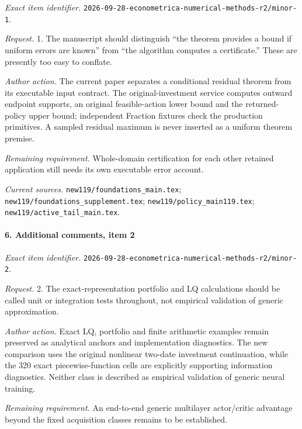 \emph{Exact item identifier.} \nolinkurl{2026-09-28-econometrica-numerical-methods-r2/minor-1}.

\par\emph{Request.} 1. The manuscript should distinguish “the theorem provides a bound if uniform errors are known” from “the algorithm computes a certificate.” These are presently too easy to conflate.

\par\emph{Author action.} The current paper separates a conditional residual theorem from its executable input contract. The original-investment service computes outward endpoint supports, an original feasible-action lower bound and the returned-policy upper bound; independent Fraction fixtures check the production primitives. A sampled residual maximum is never inserted as a uniform theorem premise.

\par\emph{Remaining requirement.} Whole-domain certification for each other retained application still needs its own executable error account.

\par\emph{Current sources.} \nolinkurl{new119/foundations_main.tex}; \nolinkurl{new119/foundations_supplement.tex}; \nolinkurl{new119/policy_main119.tex}; \nolinkurl{new119/active_tail_main.tex}.

\paragraph{6. Additional comments, item 2}

\emph{Exact item identifier.} \nolinkurl{2026-09-28-econometrica-numerical-methods-r2/minor-2}.

\par\emph{Request.} 2. The exact-representation portfolio and LQ calculations should be called unit or integration tests throughout, not empirical validation of generic approximation.

\par\emph{Author action.} Exact LQ, portfolio and finite arithmetic examples remain preserved as analytical anchors and implementation diagnostics. The new comparison uses the original nonlinear two-date investment continuation, while the 320 exact piecewise-function cells are explicitly supporting information diagnostics. Neither class is described as empirical validation of generic neural training.

\par\emph{Remaining requirement.} An end-to-end generic multilayer actor/\allowbreak{}critic advantage beyond the fixed acquisition classes remains to be established.

